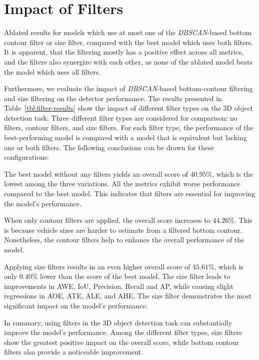 
\section{Impact of Filters}
\label{sec:impactcontourfiltering}

\begin{table}[htbp]
    
    \caption{Ablated results for models which use at most one of the \textit{DBSCAN}-based bottom contour filter or size filter, compared with the best model which uses both filters. It is apparent, that the filtering mostly has a positive effect across all metrics, and the filters also synergize with each other, as none of the ablated model beats the model which uses all filters.}
    \label{tbl:filter-results}
\end{table}

Furthermore, we evaluate the impact of \textit{DBSCAN}-based bottom-contour filtering and size filtering on the detector performance.
The results presented in Table~\ref{tbl:filter-results} show the impact of different filter types on the 3D object detection task.
Three different filter types are considered for comparison: no filters, contour filters, and size filters.
For each filter type, the performance of the best-performing model is compared with a model that is equivalent but lacking one or both filters.
The following conclusions can be drawn for these configurations:

The best model without any filters yields an overall score of $40.95\%$, which is the lowest among the three variations.
All the metrics exhibit worse performance compared to the best model.
This indicates that filters are essential for improving the model's performance.

When only contour filters are applied, the overall score increases to $44.26\%$.
This is because vehicle sizes are harder to estimate from a filtered bottom contour.
Nonetheless, the contour filters help to enhance the overall performance of the model.

Applying size filters results in an even higher overall score of $45.61\%$, which is only $0.40\%$ lower than the score of the best model.
The size filter leads to improvements in AWE, IoU, Precision, Recall and AP, while causing slight regressions in AOE, ATE, ALE, and AHE.
The size filter demonstrates the most significant impact on the model's performance.

In summary, using filters in the 3D object detection task can substantially improve the model's performance.
Among the different filter types, size filters show the greatest positive impact on the overall score, while bottom contour filters also provide a noticeable improvement.

